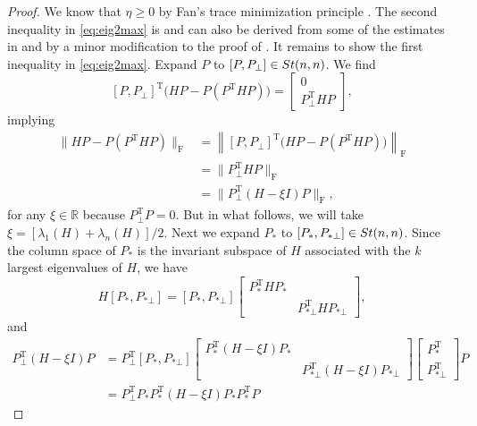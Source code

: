 \documentclass[11pt]{article}
\def\bbR{\mathbb{R}}
\newcommand\STM[2]{{\rm St}(#1,#2)}
\DeclareMathOperator{\F}{F}
\DeclareMathOperator{\T}{T}
\theoremstyle{definition}
\numberwithin{equation}{section}
\begin{document}
\begin{proof}
We know that $\eta\ge 0$ by Fan's trace minimization principle \cite{fan:1949}.
The second inequality in \eqref{eq:eig2max} is \cite[Theorem~1]{kove:1991} and can also be derived from some of the estimates in
\cite[Chapter~3]{wein:1974} and by a minor modification to the proof of \cite[Theorem~2.2]{li:2004c}. It remains to show
the first inequality in \eqref{eq:eig2max}.
Expand $P$ to $[P,P_{\bot}]\in\STM{n}{n}$. We find
$$
[P,P_{\bot}]^{\T}\big(HP-P(P^{\T}HP)\big)=\begin{bmatrix}
                                    0 \\
                                    P_{\bot}^{\T}HP
                                  \end{bmatrix},
$$
implying
\begin{align}
\|HP-P(P^{\T}HP)\|_{\F}&=\left\|[P,P_{\bot}]^{\T}\big(HP-P(P^{\T}HP)\big)\right\|_{\F} \nonumber \\
   &=\|P_{\bot}^{\T}HP\|_{\F} \nonumber\\
   &=\|P_{\bot}^{\T}(H-\xi I)P\|_{\F}, \label{eq:eig2max:pf-1}
\end{align}
for any $\xi\in\bbR$ because $P_{\bot}^{\T}P=0$. But in what follows, we will take $\xi=[\lambda_1(H)+\lambda_n(H)]/2$.
Next we expand $P_*$ to $[P_*,P_{*\bot}]\in\STM{n}{n}$. Since the column space of $P_*$ is the invariant subspace
of $H$ associated with the $k$ largest eigenvalues of $H$, we have
$$
H[P_*,P_{*\bot}]=[P_*,P_{*\bot}]\begin{bmatrix}
                                  P_*^{\T}HP_* &  \\
                                   & P_{*\bot}^{\T}HP_{*\bot}
                                \end{bmatrix},
$$
and
\begin{align}
P_{\bot}^{\T}(H-\xi I)P&=P_{\bot}^{\T}[P_*,P_{*\bot}]\begin{bmatrix}
                                  P_*^{\T}(H-\xi I)P_* &  \\
                                   & P_{*\bot}^{\T}(H-\xi I)P_{*\bot}
                                \end{bmatrix}\begin{bmatrix}
                                               P_*^{\T}\\ P_{*\bot}^{\T}
                                             \end{bmatrix}P \nonumber\\
   &=P_{\bot}^{\T}P_*P_*^{\T}(H-\xi I)P_*P_*^{\T}P

\end{align}
\end{proof}
\end{document}
